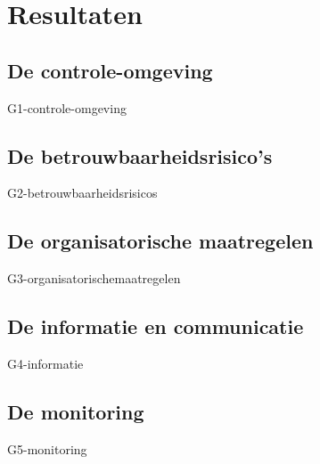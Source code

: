 \chapter{Resultaten}
\label{hoofdstuk:resultaten}
\section{De controle-omgeving}
{G1-controle-omgeving}

\section{De betrouwbaarheidsrisico's}
{G2-betrouwbaarheidsrisicos}

\section{De organisatorische maatregelen}
{G3-organisatorischemaatregelen}

\section{De informatie en communicatie}
{G4-informatie}

\section{De monitoring}
{G5-monitoring}